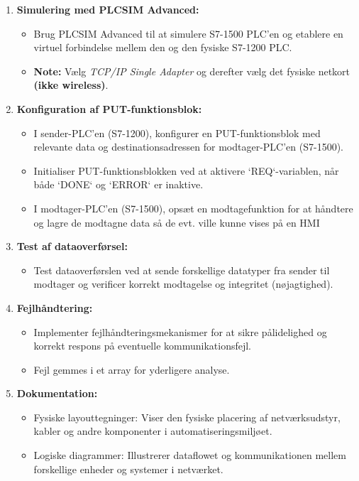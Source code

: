 \begin{enumerate}
\begin{itemize}
	\end{itemize}
	\item \textbf{Simulering med PLCSIM Advanced:}
	\begin{itemize}
		\item Brug PLCSIM Advanced til at simulere S7-1500 PLC'en og etablere en virtuel forbindelse mellem den og den fysiske S7-1200 PLC.
		\item \textbf{Note:} Vælg \textit{TCP/IP Single Adapter} og derefter vælg det fysiske netkort \textbf{(ikke wireless)}.
	\end{itemize}
	\item \textbf{Konfiguration af PUT-funktionsblok:}
	\begin{itemize}
		\item I sender-PLC'en (S7-1200), konfigurer en PUT-funktionsblok med relevante data og destinationsadressen for modtager-PLC'en (S7-1500).
		\item Initialiser PUT-funktionsblokken ved at aktivere `REQ`-variablen, når både `DONE` og `ERROR` er inaktive.
		\item I modtager-PLC'en (S7-1500), opsæt en modtagefunktion for at håndtere og lagre de modtagne data så de evt. ville kunne vises på en HMI
	\end{itemize}
	\item \textbf{Test af dataoverførsel:}
	\begin{itemize}
		\item Test dataoverførslen ved at sende forskellige datatyper fra sender til modtager og verificer korrekt modtagelse og integritet (nøjagtighed).
	\end{itemize}
	\item \textbf{Fejlhåndtering:}
	\begin{itemize}
		\item Implementer fejlhåndteringsmekanismer for at sikre pålidelighed og korrekt respons på eventuelle kommunikationsfejl.
		\item Fejl gemmes i et array for yderligere analyse.
	\end{itemize}
	\item \textbf{Dokumentation:}
	\begin{itemize}
		\item Fysiske layouttegninger: Viser den fysiske placering af netværksudstyr, kabler og andre komponenter i automatiseringsmiljøet.
		\item Logiske diagrammer: Illustrerer dataflowet og kommunikationen mellem forskellige enheder og systemer i netværket.

\end{itemize}
\end{enumerate}

